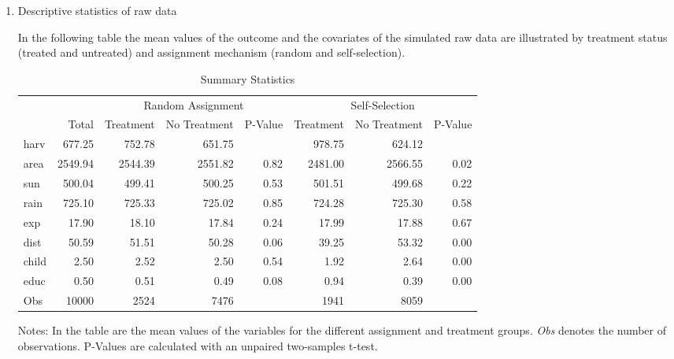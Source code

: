 \begin{enumerate}
\item Descriptive statistics of raw data

In the following table the mean values of the outcome and the covariates of the simulated raw data are illustrated by treatment status (treated and untreated) and assignment mechanism (random and self-selection). %

\begin{table}[h!]
\centering
\begin{threeparttable}
\caption{Summary Statistics} \label{tab:data}
\begin{tabular}{lrrrrrrr}
  \hline
  & &\multicolumn{3}{c}{Random Assignment} & \multicolumn{3}{c}{Self-Selection}\\
 & Total & Treatment & No Treatment & P-Value & Treatment & No Treatment & P-Value\\
 \hline
harv & 677.25 & 752.78 & 651.75 &  & 978.75 & 624.12 &  \\ 
  area & 2549.94 & 2544.39 & 2551.82 & 0.82 & 2481.00 & 2566.55 & 0.02 \\ 
  sun & 500.04 & 499.41 & 500.25 & 0.53 & 501.51 & 499.68 & 0.22 \\ 
  rain & 725.10 & 725.33 & 725.02 & 0.85 & 724.28 & 725.30 & 0.58 \\ 
  exp & 17.90 & 18.10 & 17.84 & 0.24 & 17.99 & 17.88 & 0.67 \\ 
  dist & 50.59 & 51.51 & 50.28 & 0.06 & 39.25 & 53.32 & 0.00 \\ 
  child & 2.50 & 2.52 & 2.50 & 0.54 & 1.92 & 2.64 & 0.00 \\ 
  educ & 0.50 & 0.51 & 0.49 & 0.08 & 0.94 & 0.39 & 0.00 \\ 
  Obs & 10000 & 2524 & 7476 &  & 1941 & 8059 &  \\ 
   \hline
\end{tabular}
\end{threeparttable}
\footnotesize{Notes: In the table are the mean values of the variables for the different assignment and treatment groups. \textit{Obs} denotes the number of observations. P-Values are calculated with an unpaired two-samples t-test.}
\end{table}


\end{enumerate}
